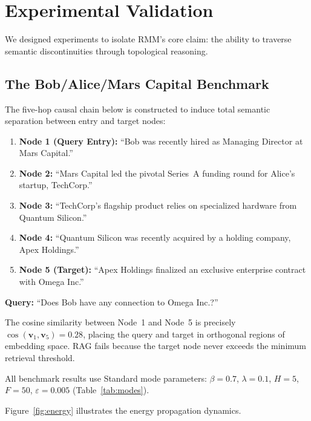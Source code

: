 \documentclass[11pt]{article}
\begin{document}
\section{Experimental Validation}

We designed experiments to isolate RMM's core claim: the ability to
traverse semantic discontinuities through topological reasoning.

\subsection{The Bob/Alice/Mars Capital Benchmark}

The five-hop causal chain below is constructed to induce total semantic
separation between entry and target nodes:

\begin{enumerate}
  \item \textbf{Node 1 (Query Entry):} ``Bob was recently hired as
        Managing Director at Mars Capital.''
  \item \textbf{Node 2:} ``Mars Capital led the pivotal Series~A funding
        round for Alice's startup, TechCorp.''
  \item \textbf{Node 3:} ``TechCorp's flagship product relies on
        specialized hardware from Quantum Silicon.''
  \item \textbf{Node 4:} ``Quantum Silicon was recently acquired by a
        holding company, Apex Holdings.''
  \item \textbf{Node 5 (Target):} ``Apex Holdings finalized an exclusive
        enterprise contract with Omega Inc.''
\end{enumerate}

\textbf{Query:} ``Does Bob have any connection to Omega Inc.?''

The cosine similarity between Node~1 and Node~5 is precisely
$\cos(\mathbf{v}_1, \mathbf{v}_5) = 0.28$, placing the query and target
in orthogonal regions of embedding space. RAG fails because the target
node never exceeds the minimum retrieval threshold.

All benchmark results use Standard mode parameters:
$\beta = 0.7$, $\lambda = 0.1$, $H = 5$, $F = 50$,
$\varepsilon = 0.005$ (Table~\ref{tab:modes}).

Figure~\ref{fig:energy} illustrates the energy propagation dynamics.
\end{document}
